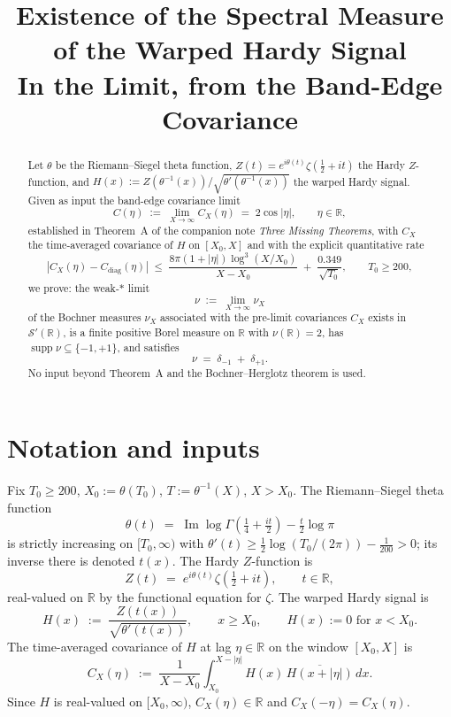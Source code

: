 \documentclass[11pt]{article}
\title{Existence of the Spectral Measure of the Warped Hardy Signal\\
In the Limit, from the Band-Edge Covariance}
\author{}
\date{}
\theoremstyle{definition}
\theoremstyle{remark}
\DeclareMathOperator{\ImOp}{Im}
\DeclareMathOperator{\supp}{supp}
\let\Im\ImOp
\begin{document}
\maketitle

\begin{abstract}
Let $\theta$ be the Riemann--Siegel theta function, $Z(t)=e^{i\theta(t)}\zeta(\tfrac12+it)$ the Hardy $Z$-function, and $H(x):=Z(\theta^{-1}(x))/\sqrt{\theta'(\theta^{-1}(x))}$ the warped Hardy signal. Given as input the band-edge covariance limit
\[
  C(\eta)\;:=\;\lim_{X\to\infty} C_X(\eta)\;=\;2\cos|\eta|,\qquad\eta\in\mathbb{R},
\]
established in Theorem~A of the companion note \emph{Three Missing Theorems}, with $C_X$ the time-averaged covariance of $H$ on $[X_0,X]$ and with the explicit quantitative rate
\[
  |C_X(\eta)-C_{\mathrm{diag}}(\eta)|\;\le\;\frac{8\pi(1+|\eta|)\log^3(X/X_0)}{X-X_0}\;+\;\frac{0.349}{\sqrt{T_0}},\qquad T_0\ge 200,
\]
we prove: the weak-$*$ limit
\[
  \nu\;:=\;\lim_{X\to\infty}\nu_X
\]
of the Bochner measures $\nu_X$ associated with the pre-limit covariances $C_X$ exists in $\mathcal{S}'(\mathbb{R})$, is a finite positive Borel measure on $\mathbb{R}$ with $\nu(\mathbb{R})=2$, has $\supp\nu\subseteq\{-1,+1\}$, and satisfies
\[
  \nu\;=\;\delta_{-1}\;+\;\delta_{+1}.
\]
No input beyond Theorem~A and the Bochner--Herglotz theorem is used.
\end{abstract}

\section{Notation and inputs}\label{sec:inputs}

Fix $T_0\ge 200$, $X_0:=\theta(T_0)$, $T:=\theta^{-1}(X)$, $X>X_0$. The Riemann--Siegel theta function
\[
  \theta(t)\;=\;\Im\log\Gamma\!\left(\tfrac14+\tfrac{it}{2}\right)-\tfrac{t}{2}\log\pi
\]
is strictly increasing on $[T_0,\infty)$ with $\theta'(t)\ge\tfrac12\log(T_0/(2\pi))-\tfrac{1}{200}>0$; its inverse there is denoted $t(x)$. The Hardy $Z$-function is
\[
  Z(t)\;=\;e^{i\theta(t)}\zeta(\tfrac12+it),\qquad t\in\mathbb{R},
\]
real-valued on $\mathbb{R}$ by the functional equation for $\zeta$. The warped Hardy signal is
\[
  H(x)\;:=\;\frac{Z(t(x))}{\sqrt{\theta'(t(x))}},\qquad x\ge X_0,\qquad H(x):=0\text{ for }x<X_0.
\]
The time-averaged covariance of $H$ at lag $\eta\in\mathbb{R}$ on the window $[X_0,X]$ is
\begin{equation}\label{eq:CX}
  C_X(\eta)\;:=\;\frac{1}{X-X_0}\int_{X_0}^{X-|\eta|}H(x)\,\overline{H(x+|\eta|)}\,dx.
\end{equation}
Since $H$ is real-valued on $[X_0,\infty)$, $C_X(\eta)\in\mathbb{R}$ and $C_X(-\eta)=C_X(\eta)$.
\end{document}
